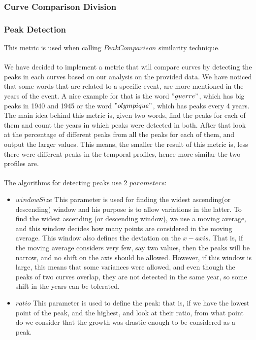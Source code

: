 \documentclass{article}
\begin{document}
\subsubsection{Curve Comparison Division}

\subsubsection{Peak Detection}

This metric is used when calling $PeakComparison$ similarity technique. \\
\\
We have decided to implement a metric that will compare curves by detecting the peaks in each curves based on our analysis on the provided data. We have noticed that some words that are related to a specific event, are more mentioned in the years of the event. A nice example for that is the word $"guerre"$, which has big peaks in 1940 and 1945 or the word $"olympique"$, which has peaks every 4 years.\\

The main idea behind this metric is, given two words, find the peaks for each of them and count the years in which peaks were detected in both. After that look at the percentage of different peaks from all the peaks for each of them, and output the larger values. This means, the smaller the result of this metric is, less there were different peaks in the temporal profiles, hence more similar the two profiles are.\\
\\
The algorithms for detecting peaks use $2$ $parameters$:
\begin{itemize}
\item $windowSize$ This parameter is used for finding the widest ascending(or descending) window and his purpose is to allow variations in the latter. To find the widest ascending (or descending window), we use a moving average, and this window decides how many points are considered in the moving average. This window also defines the deviation on the $x-axis$. That is, if the moving average considers very few, say two values, then the peaks will be narrow, and no shift on the axis should be allowed. However, if this window is large, this means that some variances were allowed, and even though the peaks of two curves overlap, they are not detected in the same year, so some shift in the years can be tolerated.
\item $ratio$ This parameter is used to define the peak: that is, if we have the lowest point of the peak, and the highest, and look at their ratio, from what point do we consider that the growth was drastic enough to be considered as a peak.
\end{itemize}
\end{document}
